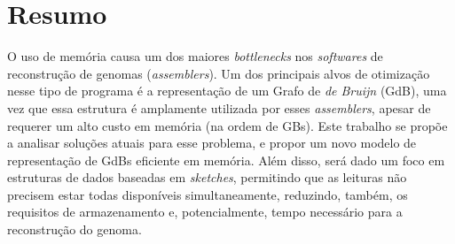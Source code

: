 \section{Resumo}

O uso de memória causa um dos maiores \emph{bottlenecks} nos \emph{softwares} de reconstrução
de genomas (\emph{assemblers}). Um dos principais alvos de otimização nesse tipo de programa
é a representação de um Grafo de \emph{de Bruijn} (GdB), uma vez que essa estrutura é amplamente utilizada
por esses \emph{assemblers}, apesar de requerer um alto custo em memória (na ordem de GBs).
Este trabalho se propõe a analisar soluções atuais para esse problema, e propor um novo modelo
de representação de GdBs eficiente em memória. Além disso, será dado um foco em estruturas de dados
baseadas em \emph{sketches}, permitindo que as leituras não precisem estar todas disponíveis simultaneamente,
reduzindo, também, os requisitos de armazenamento e, potencialmente, tempo necessário para a reconstrução
do genoma.
